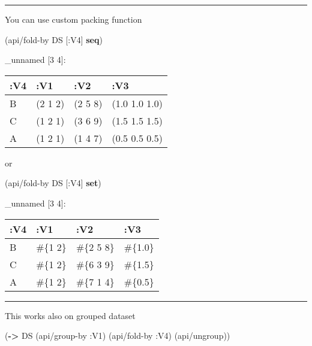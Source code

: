 \documentclass[]{article}
\newenvironment{Shaded}{\begin{snugshade}}{\end{snugshade}}
\newcommand{\AttributeTok}[1]{\textcolor[rgb]{0.77,0.63,0.00}{#1}}
\newcommand{\KeywordTok}[1]{\textcolor[rgb]{0.13,0.29,0.53}{\textbf{#1}}}
\newcommand{\NormalTok}[1]{#1}
\begin{document}
\begin{center}\rule{0.5\linewidth}{0.5pt}\end{center}

You can use custom packing function

\begin{Shaded}
\begin{Highlighting}[]
\NormalTok{(api/fold-by DS [}\AttributeTok{:V4}\NormalTok{] }\KeywordTok{seq}\NormalTok{)}
\end{Highlighting}
\end{Shaded}

\_unnamed {[}3 4{]}:

\begin{longtable}[]{@{}llll@{}}
\toprule
:V4 & :V1 & :V2 & :V3\tabularnewline
\midrule
\endhead
B & (2 1 2) & (2 5 8) & (1.0 1.0 1.0)\tabularnewline
C & (1 2 1) & (3 6 9) & (1.5 1.5 1.5)\tabularnewline
A & (1 2 1) & (1 4 7) & (0.5 0.5 0.5)\tabularnewline
\bottomrule
\end{longtable}

or

\begin{Shaded}
\begin{Highlighting}[]
\NormalTok{(api/fold-by DS [}\AttributeTok{:V4}\NormalTok{] }\KeywordTok{set}\NormalTok{)}
\end{Highlighting}
\end{Shaded}

\_unnamed {[}3 4{]}:

\begin{longtable}[]{@{}llll@{}}
\toprule
:V4 & :V1 & :V2 & :V3\tabularnewline
\midrule
\endhead
B & \#\{1 2\} & \#\{2 5 8\} & \#\{1.0\}\tabularnewline
C & \#\{1 2\} & \#\{6 3 9\} & \#\{1.5\}\tabularnewline
A & \#\{1 2\} & \#\{7 1 4\} & \#\{0.5\}\tabularnewline
\bottomrule
\end{longtable}

\begin{center}\rule{0.5\linewidth}{0.5pt}\end{center}

This works also on grouped dataset

\begin{Shaded}
\begin{Highlighting}[]
\NormalTok{(}\KeywordTok{->}\NormalTok{ DS}
\NormalTok{    (api/group-by }\AttributeTok{:V1}\NormalTok{)}
\NormalTok{    (api/fold-by }\AttributeTok{:V4}\NormalTok{)}
\NormalTok{    (api/ungroup))}
\end{Highlighting}
\end{Shaded}
\end{document}
